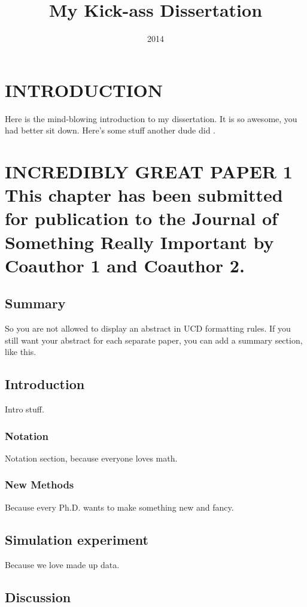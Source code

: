 \documentclass[english]{ucdenver-dissertation}
\title{My Kick-ass Dissertation}
\date{2014}
\makeatletter
\let\SF@@footnote\footnote
\def\footnote{\ifx\protect\@typeset@protect
    \expandafter\SF@@footnote
  \else
    \expandafter\SF@gobble@opt
  \fi
}
\edef\SF@gobble@opt{\noexpand\protect
  \expandafter\noexpand\csname SF@gobble@opt \endcsname}
\makeatother
\begin{document}
\chapter{INTRODUCTION}

Here is the mind-blowing introduction to my dissertation.  It is so awesome, you had better 
sit down.  Here's some stuff another dude did \citep{article_2007}.

\chapter{INCREDIBLY GREAT PAPER 1%
\footnote{This chapter has been submitted for publication to the Journal of
Something Really Important by Coauthor 1 and Coauthor 2.%
}}


\section{Summary}

So you are not allowed to display an abstract in UCD formatting rules.
If you still want your abstract for each separate paper, you can add a summary
section, like this.

\section{Introduction}

Intro stuff.

\subsection{Notation}

Notation section, because everyone loves math. 

\subsection{New Methods}

Because every Ph.D. wants to make something new and fancy.



\section{Simulation experiment}

Because we love made up data.


\section{Discussion}
\end{document}
